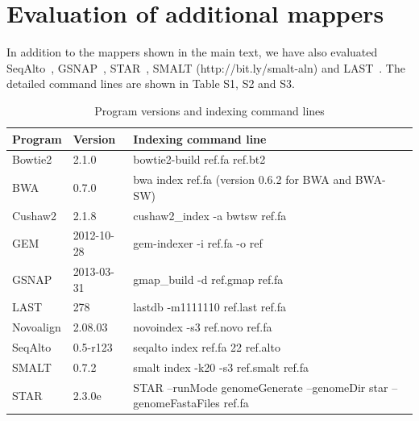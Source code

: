 \documentclass[10pt,pdftex]{article}
\begin{document}
\section{Evaluation of additional mappers}
In addition to the mappers shown in the main text, we have also evaluated
SeqAlto~\citep{Mu:2012fk}, GSNAP~\citep{Wu:2010uq}, STAR~\citep{Dobin:2013kx},
SMALT (http://bit.ly/smalt-aln) and LAST~\citep{Shrestha:2013aa}. The detailed
command lines are shown in Table S1, S2 and S3.

\begin{table}[!tbhp]
\footnotesize
\centering
\begin{tabular}{lll}
\hline
Program & Version & Indexing command line \\
\hline
Bowtie2 & 2.1.0 & bowtie2-build ref.fa ref.bt2 \\
BWA & 0.7.0 & bwa index ref.fa (version 0.6.2 for BWA and BWA-SW)\\
Cushaw2 & 2.1.8 & cushaw2\_index -a bwtsw ref.fa \\
GEM & 2012-10-28 & gem-indexer -i ref.fa -o ref \\
GSNAP & 2013-03-31 & gmap\_build -d ref.gmap ref.fa \\
LAST & 278 & lastdb -m1111110 ref.last ref.fa \\
Novoalign & 2.08.03 & novoindex -s3 ref.novo ref.fa \\
SeqAlto & 0.5-r123 & seqalto index ref.fa 22 ref.alto \\
SMALT & 0.7.2 & smalt index -k20 -s3 ref.smalt ref.fa \\
STAR & 2.3.0e & STAR --runMode genomeGenerate --genomeDir star --genomeFastaFiles ref.fa \\
\hline
\end{tabular}
\caption{Program versions and indexing command lines}
\end{table}
\end{document}

